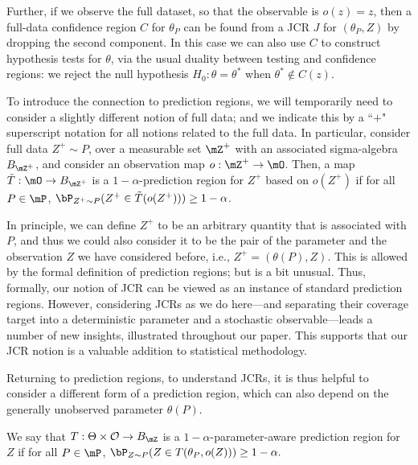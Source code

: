 \documentclass[english]{article}
\begin{document}
Further, if we observe the full dataset, so that the observable is $o(z)=z$, then a full-data confidence region $C$ for $\theta_P$ can be found from a JCR $J$ for $(\theta_P,Z)$ by dropping the second component.
In this case
we can also use $C$ to construct hypothesis tests for $\theta$, via the usual duality between testing and confidence regions: 
we reject the null hypothesis $H_0 : \theta = \theta^*$ when $\theta^* \notin C(z)$. 

To introduce the connection to prediction regions, we will temporarily need to consider a slightly different notion of full data; and we indicate this by a  ``$+$" superscript notation for all notions related to the full data.
In particular, consider full data $Z^+\sim P$, 
over a measurable set $\mZ^+$ with an associated sigma-algebra $B_{\mZ^+}$,
and consider an observation map $o:\mZ^+ \to \mO$.
Then, a map $\tilde T: \mO \to B_{\mZ^+}$
is a $1-\alpha$-prediction region for $Z^+$ based on $o(Z^+)$ if for all $P\in \mP$, $\bP_{Z^+ \sim P}(Z^+ \in \tilde T(o(Z^+)) ) \ge 1-\alpha$.

In principle, we can define $Z^+$ to be an arbitrary quantity that is associated with $P$, and thus we could also consider it to be the pair of the parameter and the observation $Z$  we have considered before, i.e., $Z^+ = (\theta(P),Z)$.
This is allowed by the formal definition of prediction regions; 
but is a bit unusual. 
Thus, formally, our notion of JCR can be viewed as an instance of standard prediction regions.
However, 
considering JCRs as we do here---and separating their coverage target into a deterministic parameter and a stochastic observable---leads a number of new insights, illustrated throughout our paper.
This supports that our JCR notion is a valuable addition to statistical methodology.


Returning to prediction regions, to understand JCRs, it is thus helpful to consider a different form of a prediction region, which can also depend on the generally unobserved parameter $\theta(P)$.

\begin{definition} \label{def-pred}
     We say that $T:\Theta\times\mathcal{O}\to B_\mZ$ is a $1-\alpha$-parameter-aware prediction region for $Z$ if for all $P \in \mP$,
    $\bP_{Z \sim P}(Z \in T(\theta_P,o(Z)) ) \ge 1-\alpha.$
\end{definition}
\end{document}
